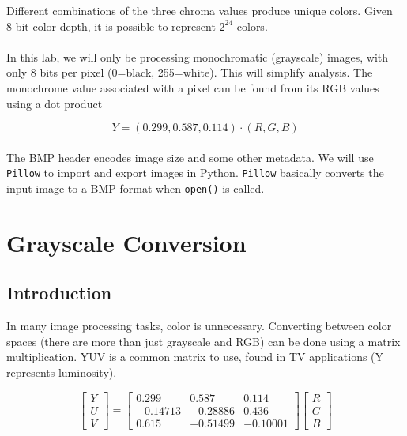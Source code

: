 \documentclass[11pt,a4paper]{article}
\begin{document}
Different combinations of the three chroma values produce unique colors. Given 8-bit color depth, it is possible to represent $2^{24}$ colors.
\paragraph*{} In this lab, we will only be processing monochromatic (grayscale) images, with only 8 bits per pixel (0=black, 255=white). This will simplify analysis. The monochrome value associated with a pixel can be found from its RGB values using a dot product

\begin{equation} \label{eq:Y}
Y = (0.299,0.587,0.114)\cdot(R,G,B)
\end{equation}

\paragraph*{} The BMP header encodes image size and some other metadata. We will use \verb|Pillow| to import and export images in Python. \verb|Pillow| basically converts the input image to a BMP format when \verb|open()| is called.

\pagebreak

\section{Grayscale Conversion}
\subsection{Introduction} In many image processing tasks, color is unnecessary. Converting between color spaces (there are more than just grayscale and RGB) can be done using a matrix multiplication. YUV is a common matrix to use, found in TV applications (Y represents luminosity).

\begin{equation}\label{eq:YUV}
     \begin{bmatrix}
       Y \\
       U \\
       V
     \end{bmatrix}
     =
     \begin{bmatrix}
       0.299 & 0.587 & 0.114 \\
       -0.14713 & -0.28886 & 0.436 \\
       0.615 & -0.51499 & -0.10001
     \end{bmatrix}
     \begin{bmatrix}
       R \\
       G \\
       B
     \end{bmatrix}
\end{equation}
\end{document}
